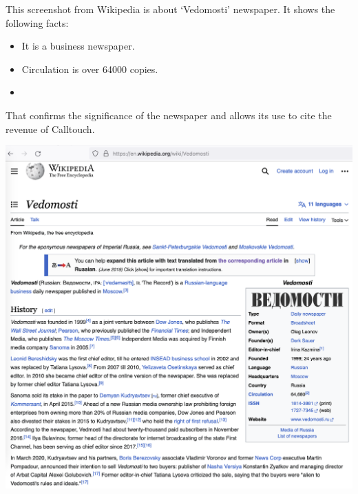 
This screenshot from Wikipedia is about `Vedomosti' newspaper. It shows the following facts:

\begin{itemize}

    \item It is a business newspaper.

    \item Circulation is over 64000 copies.

    \item {}

\end{itemize}

That confirms the significance of the newspaper and allows its use to cite the revenue of Calltouch.

\includegraphics[width=\textwidth]{wikipedia-vedomosti}

\pagebreak
